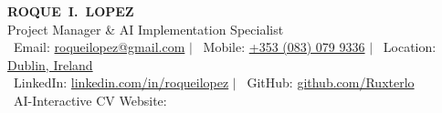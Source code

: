\documentclass[a4paper,11pt]{article}
\begin{document}
\newcommand{\cvsection}[1]{%
    \section*{%
        #1\hspace{0.5em}%
        \leaders\hbox{\rule[0.5ex]{1pt}{0.4pt}}\hfill\kern0pt%
    }%
}


\newcommand{\FirstName}{Roque}
\newcommand{\MiddleName}{I.}
\newcommand{\LastName}{Lopez}
\newcommand{\Birthyear}{1991}


\begin{center}
    {\Huge \bfseries \MakeUppercase {\FirstName \ \MiddleName \ \LastName}} \\[6pt]
    {\Large Project Manager \& AI Implementation Specialist} \\[5pt]    
    \faEnvelope\ Email: \href{mailto:roqueilopez@gmail.com}{roqueilopez@gmail.com} $|$ 
    \faPhone\ Mobile: \href{https://wa.me/message/UDT3S3HIATXDM1}{+353 (083) 079 9336} $|$ 
    \faMapPin\ Location: \href{https://share.google/zzGhtrte6JsxdfIUU}{Dublin, Ireland} \\
    
    \faLinkedin\ LinkedIn: \href{https://www.linkedin.com/in/roqueilopez}{linkedin.com/in/roqueilopez} $|$ 
    \faGithub\ GitHub: \href{https://github.com/Ruxterlo}{github.com/Ruxterlo} \\
    \faGlobe\ AI-Interactive CV Website: \href{https://tinyurl.com/Roques-AI-CV} {  }
    \faMousePointer

\end{center}
\end{document}
